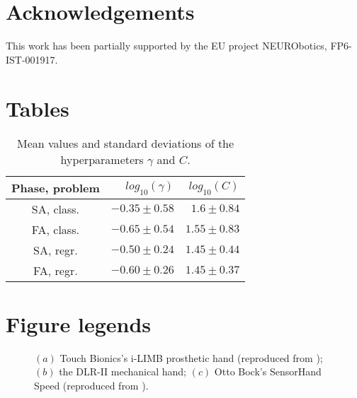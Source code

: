 \documentclass[10pt]{bmc_article}
\def\texttt{[image: ]}
\newenvironment{bmcformat}{\begin{raggedright}\baselineskip20pt\sloppy\setboolean{publ}{false}}{\end{raggedright}\baselineskip20pt\sloppy}
\begin{document}
\begin{bmcformat}
\section*{Acknowledgements}

This work has been partially supported by the EU project NEURObotics, FP6-IST-001917.

{
   }     %


\section*{Tables}

\begin{table}[!ht] \centering
  \caption{Mean values and standard deviations of the hyperparameters $\gamma$ and $C$.}
  \begin{tabular}{|c|r|r|}
    \hline
    Phase, problem & $log_{10}(\gamma)$ & $log_{10}(C)$ \\
    \hline
    SA, class.     & $-0.35 \pm 0.58$   & $1.6  \pm 0.84$ \\
    FA, class.     & $-0.65 \pm 0.54$   & $1.55 \pm 0.83$ \\
    SA, regr.      & $-0.50 \pm 0.24$   & $1.45 \pm 0.44$ \\
    FA, regr.      & $-0.60 \pm 0.26$   & $1.45 \pm 0.37$ \\
    \hline
  \end{tabular}
  \label{tab:hyp}
\end{table}

\section*{Figure legends}

\begin{figure}[!ht] \centering
  \caption{$(a)$ Touch Bionics's i-LIMB prosthetic hand (reproduced
    from \cite{ilimb}); $(b)$ the DLR-II mechanical hand; $(c)$ Otto
    Bock's SensorHand Speed (reproduced from \cite{sensorhand}).}
  \label{fig:hands}
\end{figure}


\end{bmcformat}
\end{document}
